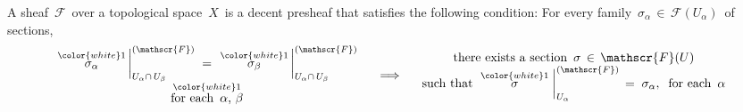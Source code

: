 
\vskip 0.5cm
\begin{definition}\label{defnSheaf}
\mbox{}\vskip 0.1cm
\noindent
A sheaf \,$\mathscr{F}$\, over a topological space \,$X$\, is a decent presheaf that satisfies the following condition:
For every family \,$\sigma_{\alpha} \,\in\, \mathscr{F}(U_{\alpha})$\, of sections,
\begin{equation*}
\begin{array}{c}
\left.\overset{{\color{white}1}}{\sigma_{\alpha}}\,\right\vert^{(\mathscr{F})}_{U_{\alpha}\cap\,U_{\beta}}
\; = \;
\left.\overset{{\color{white}1}}{\sigma_{\beta}}\,\right\vert^{(\mathscr{F})}_{U_{\alpha}\cap\,U_{\beta}}
\\
\overset{{\color{white}1}}{\textnormal{for each \,$\alpha$, $\beta$}}
\end{array}
\quad\Longrightarrow\quad
\begin{array}{c}
\textnormal{there exists a section \,$\sigma \,\in\, \mathscr{F}(U)$}
\\
\textnormal{such that \,$\left.\overset{{\color{white}1}}{\sigma}\;\right\vert^{(\mathscr{F})}_{U_{\alpha}} \,=\; \sigma_{\alpha}$},
\;\;
\textnormal{for each \,$\alpha$}
\end{array}
\end{equation*}
\end{definition}

